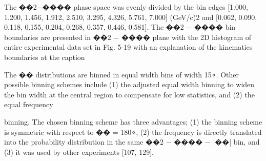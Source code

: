 The ��2−���� phase space was evenly divided by the bin edges [1.000, 1.200, 1.456,
1.912, 2.510, 3.295, 4.326, 5.761, 7.000] (GeV/c)2 and [0.062, 0.090, 0.118, 0.155,
0.204, 0.268, 0.357, 0.446, 0.581]. The ��2 − ���� bin boundaries are presented in
��2 − ���� plane with the 2D histogram of entire experimental data set in Fig. 5-19
with an explanation of the kinematics boundaries at the caption


The �� distributions are binned in equal width bins of width 15∘. Other possible
binning schemes include (1) the adjusted equal width binning to widen the bin width
at the central region to compensate for low statistics, and (2) the equal frequency

binning. The chosen binning scheme has three advantages; (1) the binning scheme is
symmetric with respect to �� = 180∘, (2) the frequency is directly translated into the
probability distribution in the same ��2 − ���� − |��| bin, and (3) it was used by other
experiments [107, 129].

\fi